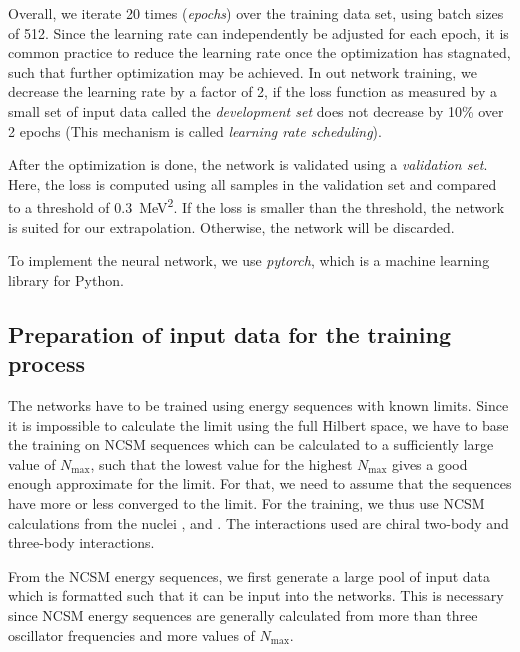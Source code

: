 Overall, we iterate 20 times (\textit{epochs}) over the training data set, using batch sizes of 512. Since the learning rate can independently be adjusted for each epoch, it is common practice to reduce the learning rate once the optimization has stagnated, such that further optimization may be achieved. In out network training, we decrease the learning rate by a factor of 2, if the loss function as measured by a small set of input data called the \textit{development set} does not decrease by 10\% over 2 epochs (This mechanism is called \textit{learning rate scheduling}).

After the optimization is done, the network is validated using a \textit{validation set}. Here, the loss is computed using all samples in the validation set and compared to a threshold of \SI{0.3}{\mega\electronvolt\squared}. If the loss is smaller than the threshold, the network is suited for our extrapolation. Otherwise, the network will be discarded.

To implement the neural network, we use \textit{pytorch}, which is a machine learning library for Python.

\subsection{Preparation of input data for the training process}
\label{sec:inflate}
The networks have to be trained using energy sequences with known limits. Since it is impossible to calculate the limit using the full Hilbert space, we have to base the training on NCSM sequences which can be calculated to a sufficiently large value of $N_\mathrm{max}$, such that the lowest value for the highest $N_\mathrm{max}$ gives a good enough approximate for the limit. For that, we need to assume that the sequences have more or less converged to the limit. For the training, we thus use NCSM calculations from the nuclei ,  and . The interactions used are chiral two-body and three-body interactions.

From the NCSM energy sequences, we first generate a large pool of input data which is formatted such that it can be input into the networks. This is necessary since NCSM energy sequences are generally calculated from more than three oscillator frequencies and more values of $N_\mathrm{max}$.

